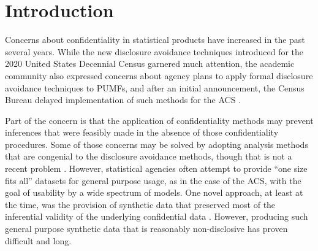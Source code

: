\documentclass[inline]{hdsr}
\begin{document}
\section*{Introduction}
\label{intro}



Concerns about confidentiality in statistical products have increased in the past several years. While the new disclosure avoidance techniques introduced for the 2020 United States Decennial Census \citep{abowd_2020_2022} garnered much attention, the academic community also expressed concerns about agency plans to apply formal disclosure avoidance techniques to \acp{PUMF}, and after an initial announcement, the Census Bureau delayed implementation of such methods for the \ac{ACS} \citep{daily_disclosure_2022}. 

Part of the concern is that the application of confidentiality methods may prevent inferences that were feasibly made in the absence of those confidentiality procedures. Some of those concerns may be solved by adopting analysis methods that are congenial \citep{meng_multiple-imputation_1994} to the disclosure avoidance methods, though that is not a recent problem \citep{AbowdSchmutte_BPEA2015}. However, statistical agencies often attempt to provide ``one size fits all'' datasets for general purpose usage, as in the case of the \ac{ACS}, with the goal of  usability by a wide spectrum of models. One novel approach, at least at the time, was the provision of synthetic data that preserved most of the inferential validity of the underlying confidential data \citep{rubin_discussion_1993,little_statistical_1993,reiter_synthetic_2023,raghunathan_synthetic_2021}. However, producing such general purpose synthetic data that is reasonably non-disclosive has proven difficult and long.
\end{document}
